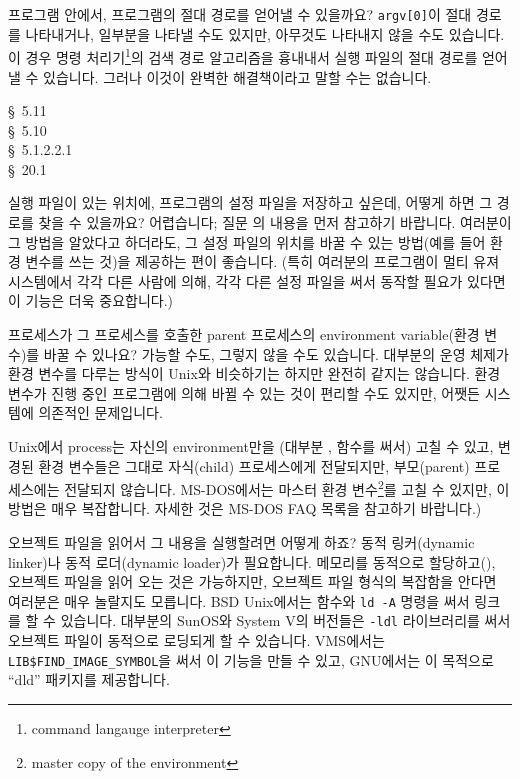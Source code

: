 \begin{faq}
	프로그램 안에서, 프로그램의 절대 경로를 얻어낼 수 있을까요?
\A
	\verb+argv[0]+이 절대 경로를 나타내거나, 일부분을 나타낼 수도
	있지만, 아무것도 나타내지 않을 수도 있습니다.
	이 경우 명령 처리기\footnote{command langauge interpreter}의
	검색 경로 알고리즘을 흉내내서 실행 파일의 절대 경로를
	얻어낼 수 있습니다.
	그러나 이것이 완벽한 해결책이라고 말할 수는 없습니다.

\R
	\cite{kr1} \S\ 5.11  \\
	\cite{kr2} \S\ 5.10  \\
	\cite{c89} \S\ 5.1.2.2.1 \\
	\cite{hs} \S\ 20.1 
\end{faq}

\begin{faq}
	실행 파일이 있는 위치에, 프로그램의 설정 파일을 저장하고 싶은데,
	어떻게 하면 그 경로를 찾을 수 있을까요?
\A
	어렵습니다; 질문 의 내용을 먼저 참고하기 바랍니다.
	여러분이 그 방법을 알았다고 하더라도, 그 설정 파일의 위치를
	바꿀 수 있는 방법(예를 들어 환경 변수를 쓰는 것)을 제공하는
	편이 좋습니다.  (특히 여러분의 프로그램이 멀티 유져 시스템에서
	각각 다른 사람에 의해,
	각각 다른 설정 파일을 써서 동작할 필요가 있다면 이 기능은
	더욱 중요합니다.)
\end{faq}

\begin{faq}
	프로세스가 그 프로세스를 호출한 parent 프로세스의 
        environment variable(환경 변수)를 바꿀 수 있나요?
\A
	가능할 수도, 그렇지 않을 수도 있습니다.
	대부분의 운영 체제가 환경 변수를 다루는 방식이 Unix와 비슷하기는
	하지만 완전히 같지는 않습니다.  환경 변수가 진행 중인 프로그램에
	의해 바뀔 수 있는 것이 편리할 수도 있지만, 어쨋든 시스템에
	의존적인 문제입니다.

	Unix에서 process는 자신의 environment만을 (대부분 
	,  함수를 써서) 고칠  수 있고,
	변경된 환경 변수들은 그대로 자식(child) 프로세스에게 전달되지만,
	부모(parent) 프로세스에는 전달되지 않습니다.
	MS-DOS에서는 마스터 환경 변수\footnote{master copy
	of the environment}를 고칠 수 있지만, 이 방법은 매우 복잡합니다.
	자세한 것은 MS-DOS FAQ 목록을 참고하기 바랍니다.)
\end{faq}

\begin{faq}
	오브젝트 파일을 읽어서 그 내용을 실행할려면 어떻게 하죠?
\A
	동적 링커(dynamic linker)나 동적 로더(dynamic loader)가 필요합니다.
	메모리를 동적으로 할당하고(), 오브젝트 파일을 읽어
	오는 것은 가능하지만, 오브젝트 파일 형식의 복잡함을 안다면
	여러분은 매우 놀랄지도 모릅니다.  BSD Unix에서는
	 함수와 \verb+ld -A+ 명령을 써서
	링크를 할 수 있습니다.  대부분의 SunOS와 System V의 버전들은
	\verb+-ldl+ 라이브러리를 써서 오브젝트 파일이 동적으로
	로딩되게 할 수 있습니다.  VMS에서는 \verb+LIB$FIND_IMAGE_SYMBOL+을 %
	써서 이 기능을 만들 수 있고, GNU에서는 이 목적으로 
	``dld'' 패키지를 제공합니다.  
\end{faq}

